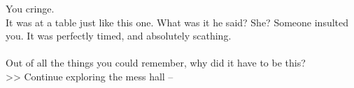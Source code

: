 You cringe.\\

It was at a table just like this one. What was it he said? She? Someone insulted you. It was perfectly timed, and absolutely scathing.\\
\\

Out of all the things you could remember, why did it have to be this?\\

>> Continue exploring the mess hall -- 